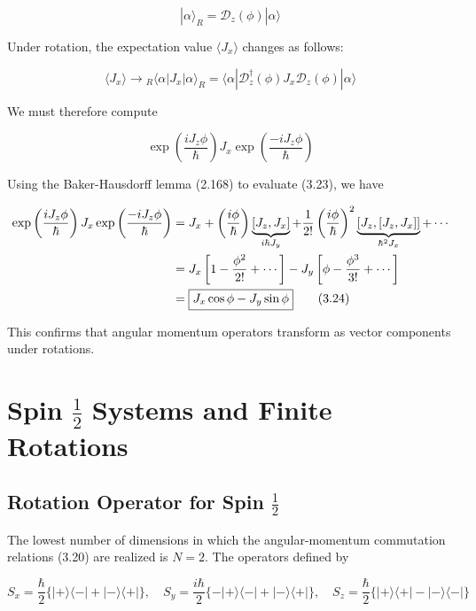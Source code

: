 \documentclass[11pt,a4paper]{article}
\begin{document}
\begin{equation}
|\alpha\rangle_R = \mathscr{D}_z(\phi)|\alpha\rangle
\tag{3.21}
\end{equation}

Under rotation, the expectation value $\langle J_x \rangle$ changes as follows:

\begin{equation}
\langle J_x \rangle \to {}_R\langle\alpha|J_x|\alpha\rangle_R = \langle\alpha|\mathscr{D}_z^\dagger(\phi)J_x\mathscr{D}_z(\phi)|\alpha\rangle
\tag{3.22}
\end{equation}

We must therefore compute

\begin{equation}
\exp\left(\frac{iJ_z\phi}{\hbar}\right)J_x\exp\left(\frac{-iJ_z\phi}{\hbar}\right)
\tag{3.23}
\end{equation}

Using the Baker-Hausdorff lemma (2.168) to evaluate (3.23), we have

\begin{align}
\exp\left(\frac{iJ_z\phi}{\hbar}\right)J_x\exp\left(\frac{-iJ_z\phi}{\hbar}\right) &= J_x + \left(\frac{i\phi}{\hbar}\right)\underbrace{[J_z, J_x]}_{i\hbar J_y} + \frac{1}{2!}\left(\frac{i\phi}{\hbar}\right)^2\underbrace{[J_z,[J_z,J_x]]}_{\hbar^2 J_x} + \cdots \notag \\
&= J_x\left[1 - \frac{\phi^2}{2!} + \cdots\right] - J_y\left[\phi - \frac{\phi^3}{3!} + \cdots\right] \notag \\
&= \boxed{J_x\cos\phi - J_y\sin\phi}
\tag{3.24}
\end{align}

This confirms that angular momentum operators transform as vector components under rotations.

\section{Spin $\frac{1}{2}$ Systems and Finite Rotations}

\subsection{Rotation Operator for Spin $\frac{1}{2}$}

The lowest number of dimensions in which the angular-momentum commutation relations (3.20) are realized is $N = 2$. The operators defined by

\begin{equation}
\boxed{S_x = \frac{\hbar}{2}\{|+\rangle\langle-| + |-\rangle\langle+|\}, \quad S_y = \frac{i\hbar}{2}\{-|+\rangle\langle-| + |-\rangle\langle+|\}, \quad S_z = \frac{\hbar}{2}\{|+\rangle\langle+| - |-\rangle\langle-|\}}
\tag{3.25}
\end{equation}
\end{document}
